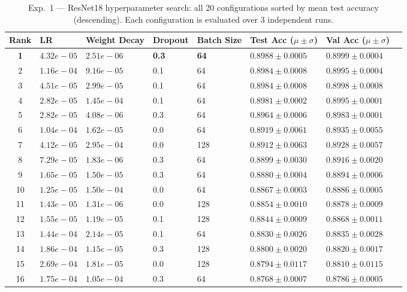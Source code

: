 \begin{table}[H]
\centering
\caption{Exp.\ 1 --- ResNet18 hyperparameter search: all 20 configurations sorted by mean test accuracy (descending). Each configuration is evaluated over 3 independent runs.}
\label{tab:exp1_resnet18}
\small
\begin{tabular}{clllllll}
\toprule
\textbf{Rank} & \textbf{LR} & \textbf{Weight Decay} & \textbf{Dropout} & \textbf{Batch Size} & \textbf{Test Acc} ($\mu\pm\sigma$) & \textbf{Val Acc} ($\mu\pm\sigma$) \\
\midrule
\textbf{1} & \textbf{$4.32e-05$} & \textbf{$2.51e-06$} & \textbf{0.3} & \textbf{64} & \textbf{$0.8988 \pm 0.0005$} & \textbf{$0.8999 \pm 0.0004$} \\
\midrule
2 & $1.16e-04$ & $9.16e-05$ & 0.1 & 64 & $0.8984 \pm 0.0008$ & $0.8995 \pm 0.0004$ \\
3 & $4.51e-05$ & $2.99e-05$ & 0.1 & 64 & $0.8984 \pm 0.0008$ & $0.8998 \pm 0.0008$ \\
4 & $2.82e-05$ & $1.45e-04$ & 0.1 & 64 & $0.8981 \pm 0.0002$ & $0.8995 \pm 0.0001$ \\
5 & $2.82e-05$ & $4.08e-06$ & 0.3 & 64 & $0.8964 \pm 0.0006$ & $0.8983 \pm 0.0001$ \\
6 & $1.04e-04$ & $1.62e-05$ & 0.0 & 64 & $0.8919 \pm 0.0061$ & $0.8935 \pm 0.0055$ \\
7 & $4.12e-05$ & $2.95e-04$ & 0.0 & 128 & $0.8912 \pm 0.0063$ & $0.8928 \pm 0.0057$ \\
8 & $7.29e-05$ & $1.83e-06$ & 0.3 & 64 & $0.8899 \pm 0.0030$ & $0.8916 \pm 0.0020$ \\
9 & $1.65e-05$ & $1.50e-05$ & 0.3 & 64 & $0.8880 \pm 0.0004$ & $0.8894 \pm 0.0006$ \\
10 & $1.25e-05$ & $1.50e-04$ & 0.0 & 64 & $0.8867 \pm 0.0003$ & $0.8886 \pm 0.0005$ \\
11 & $1.43e-05$ & $1.31e-06$ & 0.0 & 128 & $0.8854 \pm 0.0010$ & $0.8878 \pm 0.0009$ \\
12 & $1.55e-05$ & $1.19e-05$ & 0.1 & 128 & $0.8844 \pm 0.0009$ & $0.8868 \pm 0.0011$ \\
13 & $1.44e-04$ & $2.14e-05$ & 0.1 & 64 & $0.8830 \pm 0.0026$ & $0.8835 \pm 0.0028$ \\
14 & $1.86e-04$ & $1.15e-05$ & 0.3 & 128 & $0.8800 \pm 0.0020$ & $0.8820 \pm 0.0017$ \\
15 & $2.69e-04$ & $1.81e-05$ & 0.0 & 128 & $0.8794 \pm 0.0117$ & $0.8810 \pm 0.0115$ \\
16 & $1.75e-04$ & $1.05e-04$ & 0.3 & 64 & $0.8768 \pm 0.0007$ & $0.8786 \pm 0.0005$ \\

\end{tabular}
\end{table}
